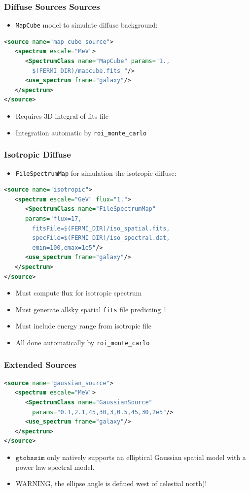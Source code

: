 \documentclass[12pt]{beamer}
\newcommand{\gtobssim}{\ensuremath{\mathtt{gtobssim}}\xspace}
\newcommand{\roimc}{\texttt{roi\_monte\_carlo}\xspace}
\newcommand{\FileSpectrumMap}{\texttt{FileSpectrumMap}\xspace}
\newcommand{\mapcube}{\texttt{MapCube}\xspace}
\begin{document}
\begin{frame}[fragile]
  \frametitle{Diffuse Sources Sources}
  \begin{itemize}
  \item \mapcube model to simulate diffuse background:
  \end{itemize}
\begin{lstlisting}[language=XML]
<source name="map_cube_source">
   <spectrum escale="MeV">
      <SpectrumClass name="MapCube" params="1., 
        $(FERMI_DIR)/mapcube.fits "/>
      <use_spectrum frame="galaxy"/>
   </spectrum>
</source>
\end{lstlisting}
  \begin{itemize}
    \item Requires 3D integral of fits file
    \item Integration automatic by \roimc
  \end{itemize}
\end{frame}

\begin{frame}[fragile]
  \frametitle{Isotropic Diffuse}
\begin{itemize}
\item \FileSpectrumMap for simulation the isotropic diffuse:
\end{itemize}

\begin{lstlisting}[language=XML]
<source name="isotropic">
   <spectrum escale="GeV" flux="1.">
      <SpectrumClass name="FileSpectrumMap" 
      params="flux=17,
        fitsFile=$(FERMI_DIR)/iso_spatial.fits,
        specFile=$(FERMI_DIR)/iso_spectral.dat,
        emin=100,emax=1e5"/>
      <use_spectrum frame="galaxy"/>
   </spectrum>
</source>
\end{lstlisting}

\begin{itemize}
  \item Must compute flux for isotropic spectrum
  \item Must generate allsky spatial \texttt{fits} file predicting 1 
  \item Must include energy range from isotropic file
  \item All done automatically by \roimc
\end{itemize}
\end{frame}

\begin{frame}[fragile]
\frametitle{Extended Sources}
\begin{lstlisting}[language=XML]
<source name="gaussian_source">
   <spectrum escale="MeV">
      <SpectrumClass name="GaussianSource" 
        params="0.1,2.1,45,30,3,0.5,45,30,2e5"/>
      <use_spectrum frame="galaxy"/>
   </spectrum>
</source>
\end{lstlisting}
  \begin{itemize}
    \item \gtobssim only natively supports an elliptical Gaussian spatial model with a power law spectral model.
    \item WARNING, the ellipse angle is defined west of celestial north)!
  \end{itemize}
\end{frame}
\end{document}
